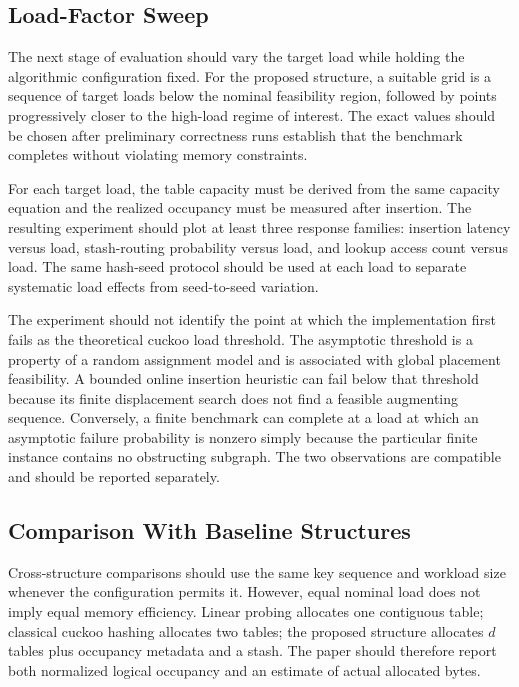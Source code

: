 \documentclass[conference]{IEEEtran}
\begin{document}
\subsection{Load-Factor Sweep}

The next stage of evaluation should vary the target load while holding the
algorithmic configuration fixed. For the proposed structure, a suitable grid
is a sequence of target loads below the nominal feasibility region, followed by
points progressively closer to the high-load regime of interest. The exact
values should be chosen after preliminary correctness runs establish that the
benchmark completes without violating memory constraints.

For each target load, the table capacity must be derived from the same
capacity equation and the realized occupancy must be measured after insertion.
The resulting experiment should plot at least three response families: insertion
latency versus load, stash-routing probability versus load, and lookup access
count versus load. The same hash-seed protocol should be used at each load to
separate systematic load effects from seed-to-seed variation.

The experiment should not identify the point at which the implementation first
fails as the theoretical cuckoo load threshold. The asymptotic threshold is a
property of a random assignment model and is associated with global placement
feasibility. A bounded online insertion heuristic can fail below that threshold
because its finite displacement search does not find a feasible augmenting
sequence. Conversely, a finite benchmark can complete at a load at which an
asymptotic failure probability is nonzero simply because the particular finite
instance contains no obstructing subgraph. The two observations are compatible
and should be reported separately.

\subsection{Comparison With Baseline Structures}

Cross-structure comparisons should use the same key sequence and workload size
whenever the configuration permits it. However, equal nominal load does not
imply equal memory efficiency. Linear probing allocates one contiguous table;
classical cuckoo hashing allocates two tables; the proposed structure allocates
$d$ tables plus occupancy metadata and a stash. The paper should therefore
report both normalized logical occupancy and an estimate of actual allocated
bytes.
\end{document}
